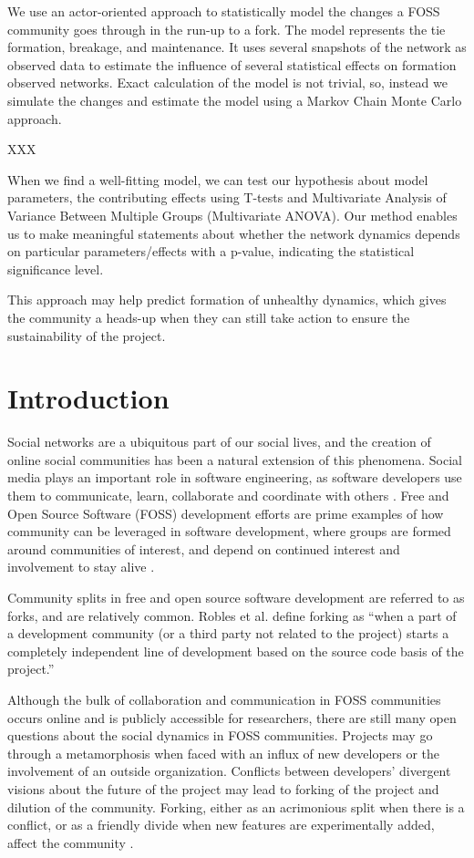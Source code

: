 \documentclass[11pt]{report}
\begin{document}
We use an actor-oriented approach to statistically model the changes a FOSS community goes through in the run-up to a fork. The model represents the tie formation, breakage, and maintenance. It uses several snapshots of the network as observed data to estimate the influence of several statistical effects on formation observed networks. Exact calculation of the model is not trivial, so, instead we simulate the changes and estimate the model using a Markov Chain Monte Carlo approach. 

XXX

When we find a well-fitting model, we can test our hypothesis about model parameters, the contributing effects using T-tests and Multivariate Analysis of Variance Between Multiple Groups (Multivariate ANOVA). Our method enables us to make meaningful statements about whether the network dynamics depends on  particular parameters/effects with a p-value, indicating the statistical significance level. 

This approach may help predict formation of unhealthy dynamics, which gives the community a heads-up when they can still take action to ensure the sustainability of the project.

\pagebreak

\section{Introduction}
\label{introduction}
Social networks are a ubiquitous part of our social lives, and the creation of online social communities has been a natural extension of this phenomena. Social media plays an important role in software engineering, as software developers use them to communicate, learn, collaborate and coordinate with others \cite{Storey}. Free and Open Source Software (FOSS) development efforts are prime examples of how community can be leveraged in software development, where groups are formed around communities of interest, and depend on continued interest and involvement to stay alive \cite{NymanCodeForking}.

Community splits in free and open source software development are referred to as forks, and are relatively common. Robles et al. \cite{Robles} define forking as ``when a part of a development community (or a third party not related to the project) starts a completely independent line of development based on the source code basis of the project.'' 

Although the bulk of collaboration and communication in FOSS communities occurs online and is publicly accessible for researchers, there are still many open questions about the social dynamics in FOSS communities. Projects may go through a metamorphosis when faced with an influx of new developers or the involvement of an outside organization. Conflicts between developers' divergent visions about the future of the project may lead to forking of the project and dilution of the community. Forking, either as an acrimonious split when there is a conflict, or as a friendly divide when new features are experimentally added, affect the community \cite{Bezrukova}.
\end{document}
